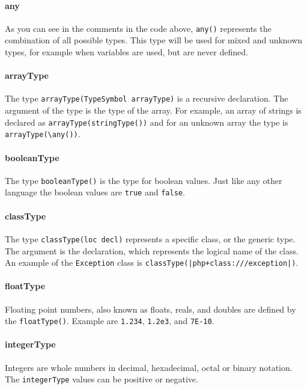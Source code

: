 \documentclass[../main.tex]{subfiles}
\begin{document}
    
    
    \paragraph{any} 
    As you can see in the comments in the code above, \texttt{any()} represents the combination of all possible types. 
    This type will be used for mixed and unknown types, for example when variables are used, but are never defined.
    
    \paragraph{arrayType}
    The type \texttt{arrayType(TypeSymbol arrayType)} is a recursive declaration.
    The argument of the type is the type of the array. 
    For example, an array of strings is declared as \texttt{arrayType(stringType())} and for an unknown array the type is \texttt{arrayType(\textbackslash{}any())}.
    
    \paragraph{booleanType}
    The type \texttt{booleanType()} is the type for boolean values.
    Just like any other language the boolean values are \texttt{true} and \texttt{false}.
    
    \paragraph{classType}
    The type \texttt{classType(loc decl)} represents a specific class, or the generic type.
    The argument is the declaration, which represents the logical name of the class. 
    An example of the \texttt{Exception} class is \texttt{classType(|php+class:///exception|)}.
    
    \paragraph{floatType}
    Floating point numbers, also known as floats, reals, and doubles are defined by the \texttt{floatType()}.
    Example are \texttt{1.234}, \texttt{1.2e3}, and \texttt{7E-10}.
    
    \paragraph{integerType}
    Integers are whole numbers in decimal, hexadecimal, octal or binary notation.
    The \texttt{integerType} values can be positive or negative.
    
\end{document}

